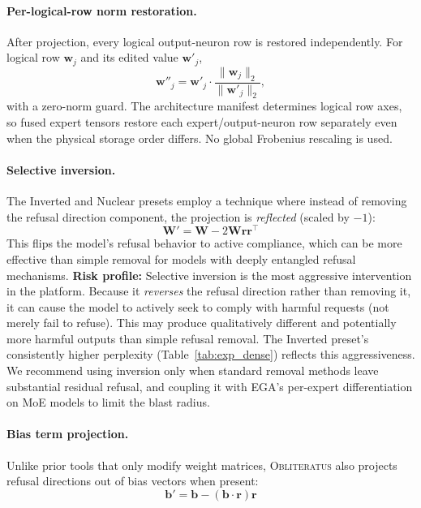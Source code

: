 \documentclass[11pt]{article}
\begin{document}
\paragraph{Per-logical-row norm restoration.}
After projection, every logical output-neuron row is restored independently. For logical row $\mathbf{w}_j$ and its edited value $\mathbf{w}'_j$,
\begin{equation}
    \mathbf{w}''_j = \mathbf{w}'_j \cdot \frac{\|\mathbf{w}_j\|_2}{\|\mathbf{w}'_j\|_2},
    \label{eq:norm_preserve}
\end{equation}
with a zero-norm guard. The architecture manifest determines logical row axes, so fused expert tensors restore each expert/output-neuron row separately even when the physical storage order differs. No global Frobenius rescaling is used.

\paragraph{Selective inversion.}
The Inverted and Nuclear presets employ a technique where instead of removing the refusal direction component, the projection is \emph{reflected} (scaled by $-1$):
\begin{equation}
    \mathbf{W}' = \mathbf{W} - 2\mathbf{W}\mathbf{r}\mathbf{r}^\top
\end{equation}
This flips the model's refusal behavior to active compliance, which can be more effective than simple removal for models with deeply entangled refusal mechanisms. \textbf{Risk profile:} Selective inversion is the most aggressive intervention in the platform. Because it \emph{reverses} the refusal direction rather than removing it, it can cause the model to actively seek to comply with harmful requests (not merely fail to refuse). This may produce qualitatively different and potentially more harmful outputs than simple refusal removal. The Inverted preset's consistently higher perplexity (Table~\ref{tab:exp_dense}) reflects this aggressiveness. We recommend using inversion only when standard removal methods leave substantial residual refusal, and coupling it with EGA's per-expert differentiation on MoE models to limit the blast radius.

\paragraph{Bias term projection.}
Unlike prior tools that only modify weight matrices, \textsc{Obliteratus} also projects refusal directions out of bias vectors when present:
\begin{equation}
    \mathbf{b}' = \mathbf{b} - (\mathbf{b} \cdot \mathbf{r})\mathbf{r}
\end{equation}
\end{document}
